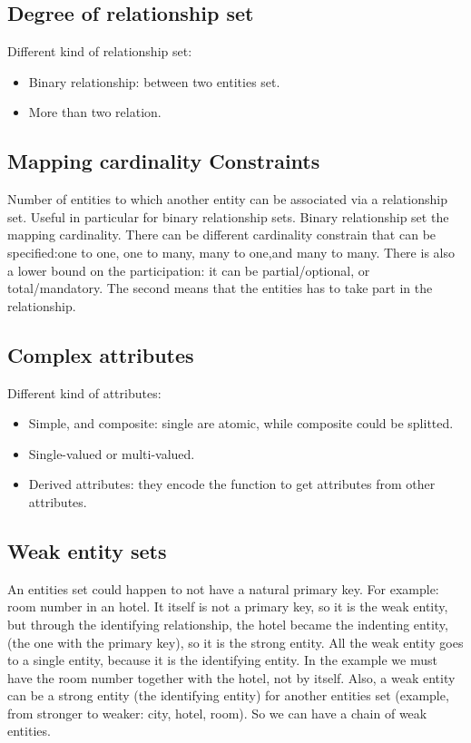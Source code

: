 \documentclass[11pt]{report}
\theoremstyle{definition}
\theoremstyle{remark}
\begin{document}
\subsection*{Degree of relationship set}
Different kind of relationship set:
\begin{itemize}
    \item Binary relationship: between two entities set.
    \item More than two relation.
\end{itemize}
\subsection*{Mapping cardinality Constraints}
Number of entities to which another entity can be associated via a relationship set. Useful in particular for binary relationship sets. Binary relationship set the mapping cardinality. 
There can be different cardinality constrain that can be specified:one to one, one to many, many to one,and many to many.
There is also a lower bound on the participation: it can be partial/optional, or total/mandatory. The second means that the entities has to take part in the relationship. 
\subsection*{Complex attributes}
Different kind of attributes:
\begin{itemize}
    \item Simple, and composite: single are atomic, while composite could be splitted. 
    \item Single-valued or multi-valued.
    \item Derived attributes: they encode the function to get attributes from other attributes.
\end{itemize}
\subsection*{Weak entity sets}
An entities set could happen to not have a natural primary key. For example: room number in an hotel. It itself is not a primary key, so it is the weak entity, but through the identifying relationship, the hotel became the indenting entity, (the one with the primary key), so it is the strong entity. All the weak entity goes to a single entity, because it is the identifying entity. In the example we must have the room number together with the hotel, not by itself. Also, a weak entity can be a strong entity (the identifying entity) for another entities set (example, from stronger to weaker: city, hotel, room). So we can have a chain of weak entities.
\end{document}
